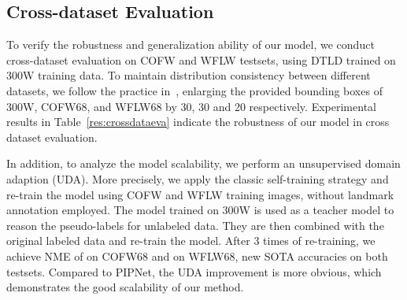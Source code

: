 \begin{table}[!t]\centering
{}
  \vspace{-2mm}
  \caption{Boost our model by using unlabeled images from other domain. Our model shows better scalability, which can be improved more by using unlabeled images. Note that it is the enlarged bounding boxes used in 300W that cause NME of , larger than  presented in Table~\ref{Tab:300w}.}
  \label{tab:WFLW_300W}
  \vspace{-1mm}
\end{table}


\subsection{Cross-dataset Evaluation}
\label{crossdataeva}


To verify the robustness and generalization ability of our model, we conduct cross-dataset evaluation on COFW and WFLW testsets, using DTLD trained on 300W training data. To maintain distribution consistency between different datasets, we follow the practice in~\cite{PIPNet2021}, enlarging the provided bounding boxes of 300W, COFW68, and WFLW68 by 30, 30 and 20 respectively. Experimental results in Table~\ref{res:crossdataeva} indicate the robustness of our model in cross dataset evaluation.

In addition, to analyze the model scalability, we perform an unsupervised domain adaption (UDA).  More precisely, we apply the classic self-training strategy and re-train the model using COFW and WFLW training images, without landmark annotation employed. The model trained on 300W is used as a teacher model to reason the pseudo-labels for unlabeled data. They are then combined with the original labeled data and re-train the model. After 3 times of re-training, we achieve NME of  on COFW68 and  on WFLW68, new SOTA accuracies on both testsets. Compared to PIPNet, the UDA improvement is more obvious, which demonstrates the good scalability of our method.



